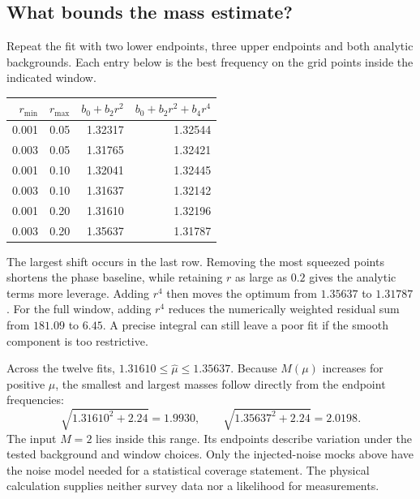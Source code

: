 \subsection{What bounds the mass estimate?}
Repeat the fit with two lower endpoints, three upper endpoints and both analytic backgrounds. Each entry below is the best frequency on the grid points inside the indicated window.
\begin{center}\begin{tabular}{rrrr}\toprule $r_{\min}$ & $r_{\max}$ & $b_0+b_2r^2$ & $b_0+b_2r^2+b_4r^4$\\\midrule
0.001 & 0.05 & 1.32317 & 1.32544\\
0.003 & 0.05 & 1.31765 & 1.32421\\
0.001 & 0.10 & 1.32041 & 1.32445\\
0.003 & 0.10 & 1.31637 & 1.32142\\
0.001 & 0.20 & 1.31610 & 1.32196\\
0.003 & 0.20 & 1.35637 & 1.31787\\\bottomrule\end{tabular}\end{center}
The largest shift occurs in the last row. Removing the most squeezed points shortens the phase baseline, while retaining $r$ as large as $0.2$ gives the analytic terms more leverage. Adding $r^4$ then moves the optimum from $1.35637$ to $1.31787$. For the full window, adding $r^4$ reduces the numerically weighted residual sum from $181.09$ to $6.45$. A precise integral can still leave a poor fit if the smooth component is too restrictive.

Across the twelve fits, $1.31610\leq\hat\mu\leq1.35637$. Because $M(\mu)$ increases for positive $\mu$, the smallest and largest masses follow directly from the endpoint frequencies:
\begin{equation}
 \sqrt{1.31610^2+2.24}=1.9930,\qquad
 \sqrt{1.35637^2+2.24}=2.0198.
\end{equation}
The input $M=2$ lies inside this range. Its endpoints describe variation under the tested background and window choices. Only the injected-noise mocks above have the noise model needed for a statistical coverage statement. The physical calculation supplies neither survey data nor a likelihood for measurements.
